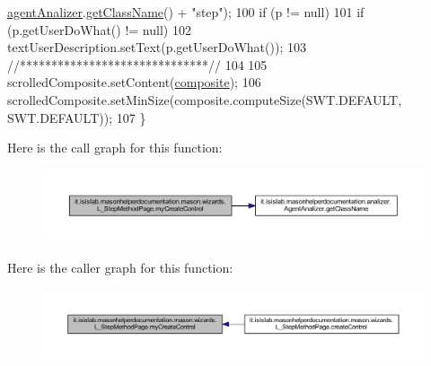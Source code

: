 \begin{DoxyCode}
      \hyperlink{classit_1_1isislab_1_1masonhelperdocumentation_1_1mason_1_1wizards_1_1_l___step_method_page_a0e0b633d8d346100b6ab65b05d9d60e6}{agentAnalizer}.\hyperlink{classit_1_1isislab_1_1masonhelperdocumentation_1_1analizer_1_1_agent_analizer_ace466e16439878a851eb63d5a11ddf43}{getClassName}() + \textcolor{stringliteral}{"step"});
100         \textcolor{keywordflow}{if} (p != null)
101             \textcolor{keywordflow}{if} (p.getUserDoWhat() != null)
102                 textUserDescription.setText(p.getUserDoWhat());
103         \textcolor{comment}{//******************************//}
104         
105         scrolledComposite.setContent(\hyperlink{classit_1_1isislab_1_1masonhelperdocumentation_1_1mason_1_1wizards_1_1_l___step_method_page_a73ff4ee05e8c5b36aed06fa604e32ac2}{composite});
106         scrolledComposite.setMinSize(composite.computeSize(SWT.DEFAULT, SWT.DEFAULT));
107     \}
\end{DoxyCode}


Here is the call graph for this function\-:\nopagebreak
\begin{figure}[H]
\begin{center}
\leavevmode
\includegraphics[width=350pt]{classit_1_1isislab_1_1masonhelperdocumentation_1_1mason_1_1wizards_1_1_l___step_method_page_aae5b5f889fca35447959d7f5f4f264a7_cgraph}
\end{center}
\end{figure}




Here is the caller graph for this function\-:\nopagebreak
\begin{figure}[H]
\begin{center}
\leavevmode
\includegraphics[width=350pt]{classit_1_1isislab_1_1masonhelperdocumentation_1_1mason_1_1wizards_1_1_l___step_method_page_aae5b5f889fca35447959d7f5f4f264a7_icgraph}
\end{center}
\end{figure}




